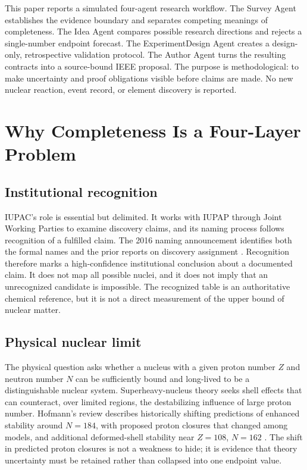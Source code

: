 \documentclass[conference]{IEEEtran}
\begin{document}
This paper reports a simulated four-agent research workflow. The Survey Agent establishes the evidence boundary and separates competing meanings of completeness. The Idea Agent compares possible research directions and rejects a single-number endpoint forecast. The ExperimentDesign Agent creates a design-only, retrospective validation protocol. The Author Agent turns the resulting contracts into a source-bound IEEE proposal. The purpose is methodological: to make uncertainty and proof obligations visible before claims are made. No new nuclear reaction, event record, or element discovery is reported.

\section{Why Completeness Is a Four-Layer Problem}

\subsection{Institutional recognition}

IUPAC's role is essential but delimited. It works with IUPAP through Joint Working Parties to examine discovery claims, and its naming process follows recognition of a fulfilled claim. The 2016 naming announcement identifies both the formal names and the prior reports on discovery assignment \cite{iupac2016,karol113,karol115}. Recognition therefore marks a high-confidence institutional conclusion about a documented claim. It does not map all possible nuclei, and it does not imply that an unrecognized candidate is impossible. The recognized table is an authoritative chemical reference, but it is not a direct measurement of the upper bound of nuclear matter.

\subsection{Physical nuclear limit}

The physical question asks whether a nucleus with a given proton number \(Z\) and neutron number \(N\) can be sufficiently bound and long-lived to be a distinguishable nuclear system. Superheavy-nucleus theory seeks shell effects that can counteract, over limited regions, the destabilizing influence of large proton number. Hofmann's review describes historically shifting predictions of enhanced stability around \(N=184\), with proposed proton closures that changed among models, and additional deformed-shell stability near \(Z=108\), \(N=162\) \cite{hofmann2015}. The shift in predicted proton closures is not a weakness to hide; it is evidence that theory uncertainty must be retained rather than collapsed into one endpoint value.
\end{document}
